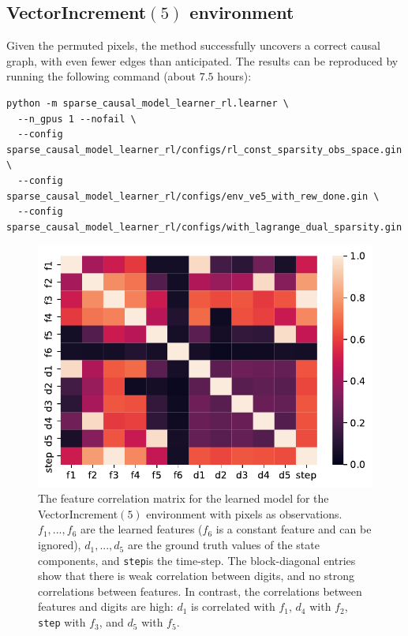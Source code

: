 \documentclass[a4paper,11pt,oneside]{report}
\begin{document}
\subsection{VectorIncrement$(5)$ environment}
Given the permuted pixels, the method successfully uncovers a correct causal graph, with even fewer edges than anticipated. The results can be reproduced by running the following command (about $7.5$ hours):
\begin{verbatim}
python -m sparse_causal_model_learner_rl.learner \
  --n_gpus 1 --nofail \
  --config sparse_causal_model_learner_rl/configs/rl_const_sparsity_obs_space.gin \
  --config sparse_causal_model_learner_rl/configs/env_ve5_with_rew_done.gin \
  --config sparse_causal_model_learner_rl/configs/with_lagrange_dual_sparsity.gin
\end{verbatim}

\begin{figure}
    \centering
    \includegraphics[width=0.7\linewidth]{plots/ve5_feature_corr}
    \caption{The feature correlation matrix for the learned model for the VectorIncrement$(5)$ environment with pixels as observations. $f_1,...,f_6$ are the learned features ($f_6$ is a constant feature and can be ignored), $d_1,...,d_5$ are the ground truth values of the state components, and {\tt step}is the time-step. The block-diagonal entries show that there is weak correlation between digits, and no strong correlations between features. In contrast, the correlations between features and digits are high: $d_1$ is correlated with $f_1$, $d_4$ with $f_2$, {\tt step} with $f_3$, and $d_5$ with $f_5$.}
    \label{fig:ve5featurecorr}
\end{figure}
\end{document}
